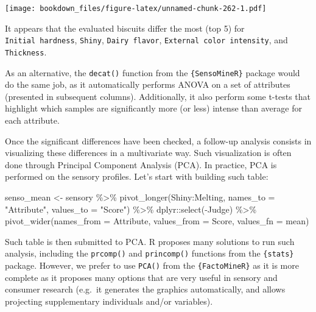 \documentclass[
]{krantz}
\makeatletter
\newenvironment{Shaded}{\begin{snugshade}}{\end{snugshade}}
\newcommand{\AttributeTok}[1]{\textcolor[rgb]{0.61,0.61,0.61}{#1}}
\newcommand{\FunctionTok}[1]{\textcolor[rgb]{0,0,0}{#1}}
\newcommand{\NormalTok}[1]{#1}
\newcommand{\OtherTok}[1]{\textcolor[rgb]{0.37,0.37,0.37}{#1}}
\newcommand{\SpecialCharTok}[1]{\textcolor[rgb]{0,0,0}{#1}}
\newcommand{\StringTok}[1]{\textcolor[rgb]{0.5,0.5,0.5}{#1}}
\renewenvironment{quote}{\begin{VF}}{\end{VF}}
\newenvironment{kframe}{%
\medskip{}
\setlength{\fboxsep}{.8em}
 \def\at@end@of@kframe{}%
 \ifinner\ifhmode%
  \def\at@end@of@kframe{\end{minipage}}%
  \begin{minipage}{\columnwidth}%
 \fi\fi%
 \def\FrameCommand##1{\hskip\@totalleftmargin \hskip-\fboxsep
 \colorbox{shadecolor}{##1}\hskip-\fboxsep
     \hskip-\linewidth \hskip-\@totalleftmargin \hskip\columnwidth}%
 \MakeFramed {\advance\hsize-\width
   \@totalleftmargin\z@ \linewidth\hsize
   \@setminipage}}%
 {\par\unskip\endMakeFramed%
 \at@end@of@kframe}
\renewenvironment{Shaded}{\begin{kframe}}{\end{kframe}}
\makeatother
\begin{document}
\texttt{[image: bookdown\_files/figure-latex/unnamed-chunk-262-1.pdf]}

It appears that the evaluated biscuits differ the most (top 5) for \texttt{Initial\ hardness}, \texttt{Shiny}, \texttt{Dairy\ flavor}, \texttt{External\ color\ intensity}, and \texttt{Thickness}.

\begin{quote}
As an alternative, the \texttt{decat()} function from the \texttt{\{SensoMineR\}} package would do the same job, as it automatically performs ANOVA on a set of attributes (presented in subsequent columns). Additionally, it also perform some t-tests that highlight which samples are significantly more (or less) intense than average for each attribute.
\end{quote}

Once the significant differences have been checked, a follow-up analysis consists in visualizing these differences in a multivariate way. Such visualization is often done through Principal Component Analysis (PCA). In practice, PCA is performed on the sensory profiles. Let's start with building such table:

\begin{Shaded}
\begin{Highlighting}[]
\NormalTok{senso\_mean }\OtherTok{\textless{}{-}}\NormalTok{ sensory }\SpecialCharTok{\%\textgreater{}\%}
  \FunctionTok{pivot\_longer}\NormalTok{(Shiny}\SpecialCharTok{:}\NormalTok{Melting, }
               \AttributeTok{names\_to =} \StringTok{"Attribute"}\NormalTok{, }\AttributeTok{values\_to =} \StringTok{"Score"}\NormalTok{) }\SpecialCharTok{\%\textgreater{}\%}
\NormalTok{  dplyr}\SpecialCharTok{::}\FunctionTok{select}\NormalTok{(}\SpecialCharTok{{-}}\NormalTok{Judge) }\SpecialCharTok{\%\textgreater{}\%}
  \FunctionTok{pivot\_wider}\NormalTok{(}\AttributeTok{names\_from =}\NormalTok{ Attribute, }\AttributeTok{values\_from =}\NormalTok{ Score, }
              \AttributeTok{values\_fn =}\NormalTok{ mean)}
\end{Highlighting}
\end{Shaded}

Such table is then submitted to PCA. R proposes many solutions to run such analysis, including the \texttt{prcomp()} and \texttt{princomp()} functions from the \texttt{\{stats\}} package. However, we prefer to use \texttt{PCA()} from the \texttt{\{FactoMineR\}} as it is more complete as it proposes many options that are very useful in sensory and consumer research (e.g.~it generates the graphics automatically, and allows projecting supplementary individuals and/or variables).
\end{document}
